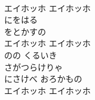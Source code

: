 \documentclass[10pt,b5j]{tarticle} %
\begin{document}
\begin{enumerate}
\begin{minipage}[c]{\blocksize}
        \vspace{\linespace}
        \item~\\
        エイホッホ エイホッホ\\
        にをはる \\
        をとかすの\\
        エイホッホ エイホッホ\\
        のの くるいき\\
        さがつらけりゃ\\
        にさけべ おろかもの\\
        エイホッホ エイホッホ
    
    \end{minipage}
\end{enumerate} %
\end{document}
